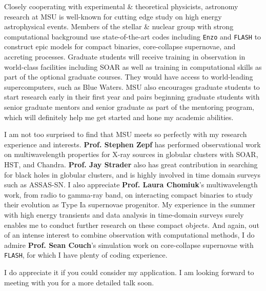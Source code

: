 \documentclass[11pt, a4paper]{awesome-cv} %
\begin{document}
\makecvheader %



\begin{cvletter}





Closely cooperating with experimental \& theoretical physicists, astronomy research at MSU is well-known for cutting edge study on high energy astrophysical events. Members of the stellar \& nuclear group with strong computational background use state-of-the-art codes including \texttt{Enzo} and \texttt{FLASH} to construct epic models for compact binaries, core-collapse supernovae, and accreting processes. Graduate students will receive training in observation in world-class facilities including SOAR as well as training in computational skills as part of the optional graduate courses. They would have access to world-leading supercomputers, such as Blue Waters. MSU also encourages graduate students to start research early in their first year and pairs beginning graduate students with senior graduate mentors and senior graduate as part of the mentoring program, which will definitely help me get started and hone my academic abilities.

I am not too surprised to find that MSU meets so perfectly with my research experience and interests. \textbf{Prof. Stephen Zepf} has performed observational work on multiwavelength properties for X-ray sources in globular clusters with SOAR, HST, and Chandra. \textbf{Prof. Jay Strader} also has great contribution in searching for black holes in globular clusters, and is highly involved in time domain surveys such as ASSAS-SN. I also appreciate \textbf{Prof. Laura Chomiuk}’s multiwavelength work, from radio to gamma-ray band, on interacting compact binaries to study their evolution as Type Ia supernovae progenitor. My experience in the summer with high energy transients and data analysis in time-domain surveys surely enables me to conduct further research on these compact objects. And again, out of an intense interest to combine observation with computational methods, I do admire \textbf{Prof. Sean Couch}’s simulation work on core-collapse supernovae with \texttt{FLASH}, for which I have plenty of coding experience.


I do appreciate it if you could consider my application. I am looking forward to meeting with you for a more detailed talk soon.

\end{cvletter}


\end{document}
